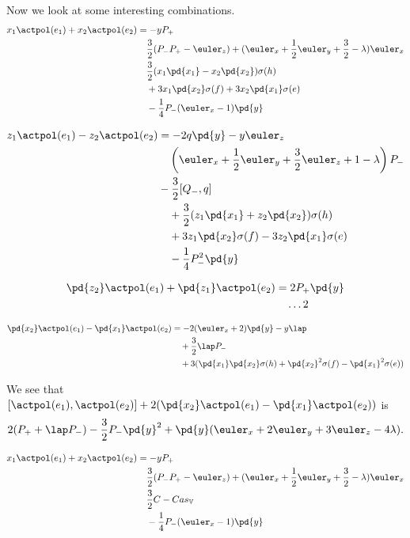 \begin{appendices}
Now we look at some interesting combinations.
\begin{align}
x_1 \actpol(e_1) + x_2 \actpol(e_2) &= -y P_+ \label{eq:comb1}\\
        & \quad \frac{3}{2}(P_-P_+ - \euler_z)  + (\euler_x + \frac{1}{2}\euler_y + \frac{3}{2} - \lambda)\euler_x \label{eq:comb1a}\\
        & \quad \frac{3}{2}(x_1\pd{x_1} - x_2\pd{x_2}) \sigma(h) \\
        & \quad + 3x_1\pd{x_2}\sigma(f) + 3x_2\pd{x_1}\sigma(e) \\
        & \quad - \frac{1}{4}P_- (\euler_x - 1) \pd{y}
\end{align}


\begin{align}
z_1 \actpol(e_1) - z_2 \actpol(e_2) &= -2q\pd{y} - y \euler_z \label{eq:comb2}\\
        & \quad \left( \euler_x + \frac{1}{2}\euler_y  + \frac{3}{2}\euler_z + 1 - \lambda \right) P_-\\
        & - \frac{3}{2} [Q_-, q] \\
        & \quad + \frac{3}{2}(z_1\pd{x_1} + z_2\pd{x_2})\sigma(h) \\
        & \quad + 3 z_1 \pd{x_2} \sigma(f) - 3 z_2 \pd{x_1} \sigma(e) \\
        & \quad -\frac{1}{4}P_-^2 \pd{y}
\end{align}

\begin{align}
\pd{z_2} \actpol(e_1) + \pd{z_1} \actpol(e_2) &= 2 P_+\pd{y} \\
        & \quad \dots
2\end{align}

\begin{align}
\pd{x_2} \actpol(e_1) - \pd{x_1} \actpol(e_2) &= -2 (\euler_x + 2)\pd{y} - y \lap\\
        & \quad + \frac{3}{2} \lap P_- \\
        & \quad + 3 ( \pd{x_1} \pd{x_2} \sigma(h) + \pd{x_2}^2 \sigma(f) - \pd{x_1}^2 \sigma(e))
\end{align}

We see that $[\actpol(e_1), \actpol(e_2)] + 2(\pd{x_2} \actpol(e_1) - \pd{x_1} \actpol(e_2))$ is
\begin{equation} \label{eq:vector-free}
2(P_+ + \lap P_-) - \frac{3}{2}P_- \pd{y}^2 + \pd{y}(\euler_x + 2\euler_y + 3\euler_z - 4\lambda).
\end{equation}

\begin{align}
x_1 \actpol(e_1) + x_2 \actpol(e_2) &= -y P_+ \\
        & \quad \frac{3}{2}(P_-P_+ - \euler_z)  + (\euler_x + \frac{1}{2}\euler_y + \frac{3}{2} - \lambda)\euler_x \label{eq:comb1a}\\
        & \quad \frac{3}{2} C - Cas_\mathbb{V} \\
        & \quad - \frac{1}{4}P_- (\euler_x - 1) \pd{y}
\end{align}


\end{appendices}
